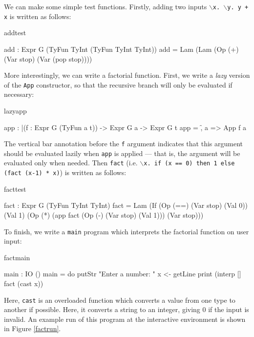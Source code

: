 \noindent
We can make some simple test functions. Firstly, adding two inputs
\texttt{$\backslash$x. $\backslash$y. y + x} is written as follows:

\begin{SaveVerbatim}{addtest}

add : Expr G (TyFun TyInt (TyFun TyInt TyInt))
add = Lam (Lam (Op (+) (Var stop) (Var (pop stop))))
  
\end{SaveVerbatim}

\noindent
More interestingly, we can write a factorial function. First, we write a \emph{lazy}
version of the \texttt{App} constructor, so that the recursive branch will only
be evaluated if necessary:

\begin{SaveVerbatim}{lazyapp}
 
app : |(f : Expr G (TyFun a t)) -> Expr G a -> Expr G t
app = \f, a => App f a

\end{SaveVerbatim}

\noindent
The vertical bar annotation before the \texttt{f} argument indicates that this
argument should be evaluated lazily when \texttt{app} is applied --- that is, the
argument will be evaluated only when needed.
Then \texttt{fact} 
(i.e. \texttt{$\backslash$x. if (x == 0) then 1 else (fact (x-1) * x)})
is written as follows:

\begin{SaveVerbatim}{facttest}

fact : Expr G (TyFun TyInt TyInt)
fact = Lam (If (Op (==) (Var stop) (Val 0))
               (Val 1) (Op (*) (app fact (Op (-) (Var stop) (Val 1))) 
                               (Var stop)))

\end{SaveVerbatim}

To finish, we write a \texttt{main} program which interprets the factorial function
on user input:

\begin{SaveVerbatim}{factmain}

main : IO ()
main = do putStr "Enter a number: "
          x <- getLine
          print (interp [] fact (cast x)) 

\end{SaveVerbatim}

\noindent
Here, \texttt{cast} is an overloaded function which converts a value from one
type to another if possible. Here, it converts a string to
an integer, giving 0 if the input is invalid. An example run of this program
at the \Idris{} interactive environment is shown in Figure \ref{factrun}.


